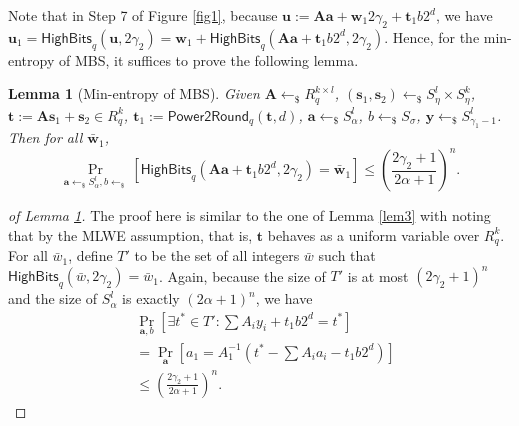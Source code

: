 \documentclass[conference]{IEEEtran}
\newtheorem{lemma}[theorem]{Lemma}
\newtheorem{proof}{Proof}
\begin{document}
	Note that in Step 7 of Figure \ref{fig1}, because $\mathbf{u}:=\mathbf{A}\mathbf{a}+\mathbf{w}_1 2\gamma_2+\mathbf{t}_1b2^d$, we have  $\mathbf{u}_1=\textsf{HighBits}_q(\mathbf{u}, 2\gamma_2)=\mathbf{w}_1+\textsf{HighBits}_q(\mathbf{A}\mathbf{a}+\mathbf{t}_1b2^d, 2\gamma_2)$. Hence, for the min-entropy of \textsf{MBS}, it suffices to prove the following lemma.
	\begin{lemma}[Min-entropy of \textsf{MBS}] \label{minentro}
		Given $\mathbf{A} \leftarrow_{\$} R_q^{k \times l}$, $(\mathbf{s}_1, \mathbf{s}_2) \leftarrow_{\$} S_\eta^{l} \times  S_\eta^{k}$, $\mathbf{t} :=\mathbf{A}\mathbf{s}_1+\mathbf{s}_2 \in R_q^{k}$, $\mathbf{t}_1:=\mathsf{Power2Round}_q(\mathbf{t},d)$,  $\mathbf{a} \leftarrow_{\$} S^l_{\alpha}$, $b \leftarrow_{\$} S_{\sigma}$, $\mathbf{y}\leftarrow_{\$} S_{\gamma_1-1}^l$. Then for all $\bar{\mathbf{w}}_1$,
		\begin{equation}\label{k17}
	 \Pr_{\mathbf{a} \leftarrow_{\$} S^l_{\alpha}, b \leftarrow_{\$}}[\mathsf{HighBits}_q(\mathbf{A}\mathbf{a}+\mathbf{t}_1b2^d, 2\gamma_2)=\bar{\mathbf{w}}_1] \leq \left(\frac{2\gamma_2+1}{2\alpha+1}\right)^n.
		\end{equation}
		
	\end{lemma}
	
	
	\begin{proof}[of Lemma \ref{minentro}] 
		The proof here is similar to the one of Lemma \ref{lem3} with noting that by the \textsf{MLWE} assumption, that is, $\mathbf{t}$ behaves as a uniform variable over $R_q^{k}$.
		For all $\bar{w}_1$, define $T'$ to be the set of all integers $\bar{w}$ such that  $\mathsf{HighBits}_q(\bar{w}, 2\gamma_2)=\bar{w}_1$. Again, because the size of $T'$ is at most $(2\gamma_2+1)^n$ and the size of $S_{\alpha}^l$ is exactly $(2\alpha+1)^n$, we have 
		\begin{equation*}
		\begin{split}
		&\Pr_{\mathbf{a},b}\left[\exists t^*\in T': \sum A_iy_i+t_1b2^d =t^*\right] \\&=	\Pr_{\mathbf{a}}[a_1 = A_1^{-1}(t^*-\sum A_ia_i -t_1b2^d)]\\
		& \leq \left(\frac{2\gamma_2+1}{2\alpha+1}\right)^n.
		\end{split}
		\end{equation*}
	\end{proof}
	
\end{document}

